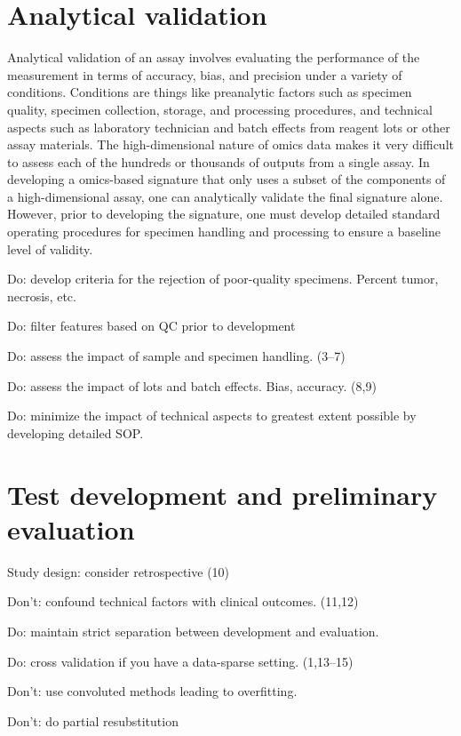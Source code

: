 \documentclass[11pt]{article}
\begin{document}
\section{Analytical validation}\label{analytical-validation}

Analytical validation of an assay involves evaluating the performance of
the measurement in terms of accuracy, bias, and precision under a
variety of conditions. Conditions are things like preanalytic factors
such as specimen quality, specimen collection, storage, and processing
procedures, and technical aspects such as laboratory technician and
batch effects from reagent lots or other assay materials. The
high-dimensional nature of omics data makes it very difficult to assess
each of the hundreds or thousands of outputs from a single assay. In
developing a omics-based signature that only uses a subset of the
components of a high-dimensional assay, one can analytically validate
the final signature alone. However, prior to developing the signature,
one must develop detailed standard operating procedures for specimen
handling and processing to ensure a baseline level of validity.

Do: develop criteria for the rejection of poor-quality specimens.
Percent tumor, necrosis, etc.

Do: filter features based on QC prior to development

Do: assess the impact of sample and specimen handling. (3--7)

Do: assess the impact of lots and batch effects. Bias, accuracy. (8,9)

Do: minimize the impact of technical aspects to greatest extent possible
by developing detailed SOP.

\section{Test development and preliminary
evaluation}\label{test-development-and-preliminary-evaluation}

Study design: consider retrospective (10)

Don't: confound technical factors with clinical outcomes. (11,12)

Do: maintain strict separation between development and evaluation.

Do: cross validation if you have a data-sparse setting. (1,13--15)

Don't: use convoluted methods leading to overfitting.

Don't: do partial resubstitution
\end{document}
